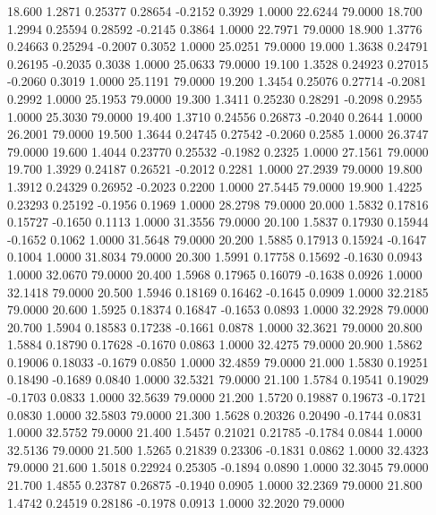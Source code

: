   18.600   1.2871   0.25377   0.28654  -0.2152   0.3929   1.0000  22.6244  79.0000
  18.700   1.2994   0.25594   0.28592  -0.2145   0.3864   1.0000  22.7971  79.0000
  18.900   1.3776   0.24663   0.25294  -0.2007   0.3052   1.0000  25.0251  79.0000
  19.000   1.3638   0.24791   0.26195  -0.2035   0.3038   1.0000  25.0633  79.0000
  19.100   1.3528   0.24923   0.27015  -0.2060   0.3019   1.0000  25.1191  79.0000
  19.200   1.3454   0.25076   0.27714  -0.2081   0.2992   1.0000  25.1953  79.0000
  19.300   1.3411   0.25230   0.28291  -0.2098   0.2955   1.0000  25.3030  79.0000
  19.400   1.3710   0.24556   0.26873  -0.2040   0.2644   1.0000  26.2001  79.0000
  19.500   1.3644   0.24745   0.27542  -0.2060   0.2585   1.0000  26.3747  79.0000
  19.600   1.4044   0.23770   0.25532  -0.1982   0.2325   1.0000  27.1561  79.0000
  19.700   1.3929   0.24187   0.26521  -0.2012   0.2281   1.0000  27.2939  79.0000
  19.800   1.3912   0.24329   0.26952  -0.2023   0.2200   1.0000  27.5445  79.0000
  19.900   1.4225   0.23293   0.25192  -0.1956   0.1969   1.0000  28.2798  79.0000
  20.000   1.5832   0.17816   0.15727  -0.1650   0.1113   1.0000  31.3556  79.0000
  20.100   1.5837   0.17930   0.15944  -0.1652   0.1062   1.0000  31.5648  79.0000
  20.200   1.5885   0.17913   0.15924  -0.1647   0.1004   1.0000  31.8034  79.0000
  20.300   1.5991   0.17758   0.15692  -0.1630   0.0943   1.0000  32.0670  79.0000
  20.400   1.5968   0.17965   0.16079  -0.1638   0.0926   1.0000  32.1418  79.0000
  20.500   1.5946   0.18169   0.16462  -0.1645   0.0909   1.0000  32.2185  79.0000
  20.600   1.5925   0.18374   0.16847  -0.1653   0.0893   1.0000  32.2928  79.0000
  20.700   1.5904   0.18583   0.17238  -0.1661   0.0878   1.0000  32.3621  79.0000
  20.800   1.5884   0.18790   0.17628  -0.1670   0.0863   1.0000  32.4275  79.0000
  20.900   1.5862   0.19006   0.18033  -0.1679   0.0850   1.0000  32.4859  79.0000
  21.000   1.5830   0.19251   0.18490  -0.1689   0.0840   1.0000  32.5321  79.0000
  21.100   1.5784   0.19541   0.19029  -0.1703   0.0833   1.0000  32.5639  79.0000
  21.200   1.5720   0.19887   0.19673  -0.1721   0.0830   1.0000  32.5803  79.0000
  21.300   1.5628   0.20326   0.20490  -0.1744   0.0831   1.0000  32.5752  79.0000
  21.400   1.5457   0.21021   0.21785  -0.1784   0.0844   1.0000  32.5136  79.0000
  21.500   1.5265   0.21839   0.23306  -0.1831   0.0862   1.0000  32.4323  79.0000
  21.600   1.5018   0.22924   0.25305  -0.1894   0.0890   1.0000  32.3045  79.0000
  21.700   1.4855   0.23787   0.26875  -0.1940   0.0905   1.0000  32.2369  79.0000
  21.800   1.4742   0.24519   0.28186  -0.1978   0.0913   1.0000  32.2020  79.0000
